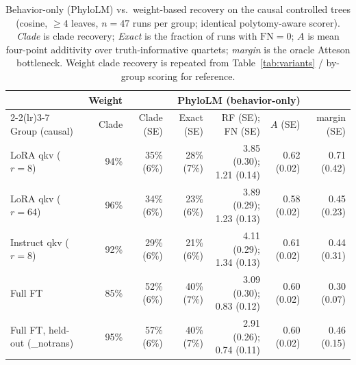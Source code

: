 \documentclass{article}
\theoremstyle{definition}
\theoremstyle{plain}
\begin{document}
\begin{table}[h]
\caption{Behavior-only (PhyloLM) vs.\ weight-based recovery on the causal controlled trees (cosine,
  $\geq 4$ leaves, $n=47$ runs per group; identical polytomy-aware scorer). \emph{Clade} is clade
  recovery; \emph{Exact} is the fraction of runs with $\mathrm{FN}=0$; $A$ is mean four-point
  additivity over truth-informative quartets; \emph{margin} is the oracle Atteson bottleneck. Weight
  clade recovery is repeated from Table~\ref{tab:variants} / by-group scoring for reference.}
\label{tab:phylolm}
\centering
\small
\setlength{\tabcolsep}{2pt}
\begin{tabular}{lrrrrrr}
\toprule
 & Weight & \multicolumn{5}{c}{PhyloLM (behavior-only)} \\
\cmidrule(lr){2-2}\cmidrule(lr){3-7}
Group (causal) & Clade & Clade (SE) & Exact (SE) & RF (SE); FN (SE) & $A$ (SE) & margin (SE) \\
\midrule
LoRA qkv ($r{=}8$)      & 94\% & 35\% (6\%) & 28\% (7\%) & 3.85 (0.30); 1.21 (0.14) & 0.62 (0.02) & 0.71 (0.42) \\
LoRA qkv ($r{=}64$)     & 96\% & 34\% (6\%) & 23\% (6\%) & 3.89 (0.29); 1.23 (0.13) & 0.58 (0.02) & 0.45 (0.23) \\
Instruct qkv ($r{=}8$)  & 92\% & 29\% (6\%) & 21\% (6\%) & 4.11 (0.29); 1.34 (0.13) & 0.61 (0.02) & 0.44 (0.31) \\
Full FT                 & 85\% & 52\% (6\%) & 40\% (7\%) & 3.09 (0.30); 0.83 (0.12) & 0.60 (0.02) & 0.30 (0.07) \\
Full FT, held-out (\_notrans) & 95\% & 57\% (6\%) & 40\% (7\%) & 2.91 (0.26); 0.74 (0.11) & 0.60 (0.02) & 0.46 (0.15) \\
\bottomrule
\end{tabular}
\end{table}
\end{document}
